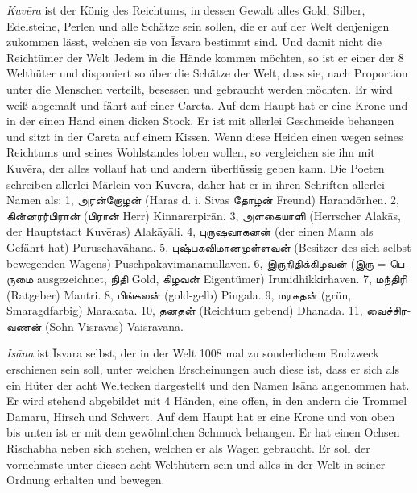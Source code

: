 \documentclass{article}
\newcommand{\TamilText}[1]{\texttamil{#1}}
\newcommand{\tam}[1]{\TamilText{#1}}
\begin{document}
\emph{Kuv\={e}ra} ist der König des Reichtums, in dessen Gewalt alles Gold, Silber, Edelsteine, Perlen und alle Schätze sein sollen, die er auf der Welt denjenigen zukommen lässt, welchen sie von \={I}svara bestimmt sind. Und damit nicht die Reichtümer der Welt Jedem in die Hände kommen möchten, so ist er einer der 8 Welthüter und disponiert so über die Schätze der Welt, dass sie, nach Proportion unter die Menschen verteilt, besessen und gebraucht werden möchten. Er wird weiß abgemalt und fährt auf einer Careta. Auf dem Haupt hat er eine Krone und in der einen Hand einen dicken Stock. Er ist mit allerlei Geschmeide behangen und sitzt in der Careta auf einem Kissen. Wenn diese Heiden einen wegen seines Reichtums und seines Wohlstandes loben wollen, so vergleichen sie ihn mit Kuv\={e}ra, der alles vollauf hat und andern überflüssig geben kann. Die Poeten schreiben allerlei Märlein von Kuv\={e}ra, daher hat er in ihren Schriften allerlei Namen als: 1, \tam{அரன்றோழன்} (Haras d. i. Sivas \tam{தோழன்} Freund) Harand\={o}rhen. 2, \tam{கின்னரர்பிரான்} (\tam{பிரான்} Herr) Kinnarerpir\={a}n. 3, \tam{அளகையாளி} (Herrscher Alak\={a}s, der Hauptstadt Kuv\={e}ras) Alak\={a}y\={a}li. 4, \tam{புருஷவாகனன்} (der einen Mann als Gefährt hat) Puruschav\={a}hana. 5, \tam{புஷ்பகவிமானமுள்ளவன்} (Besitzer des sich selbst bewegenden Wagens) Puschpakavim\={a}namullaven. 6, \tam{இருநிதிக்கிழவன்} (\tam{இரு} = \tam{பெருமை} ausgezeichnet, \tam{நிதி} Gold, \tam{கிழவன்} Eigentümer) Irunidhikkirhaven. 7, \tam{மந்திரி} (Ratgeber) Mantri. 8, \tam{பிங்கலன்} (gold-gelb) Pingala. 9, \tam{மரகதன்} (grün, Smaragdfarbig) Marakata. 10, \tam{தனதன்} (Reichtum gebend) Dhanada. 11, \tam{வைச்சிரவணன்} (Sohn Visravas) Vaisravana.

\emph{Is\={a}na} ist \={I}svara selbst, der in der Welt 1008 mal zu sonderlichem Endzweck erschienen sein soll, unter welchen Erscheinungen auch diese ist, dass er sich als ein Hüter der acht Weltecken dargestellt und den Namen Is\={a}na angenommen hat. Er wird stehend abgebildet mit 4 Händen, eine offen, in den andern die Trommel Damaru, Hirsch und Schwert. Auf dem Haupt hat er eine Krone und von oben bis unten ist er mit dem gewöhnlichen Schmuck behangen. Er hat einen Ochsen Rischabha neben sich stehen, welchen er als Wagen gebraucht. Er soll der vornehmste unter diesen acht Welthütern sein und alles in der Welt in seiner Ordnung erhalten und bewegen.
\end{document}
